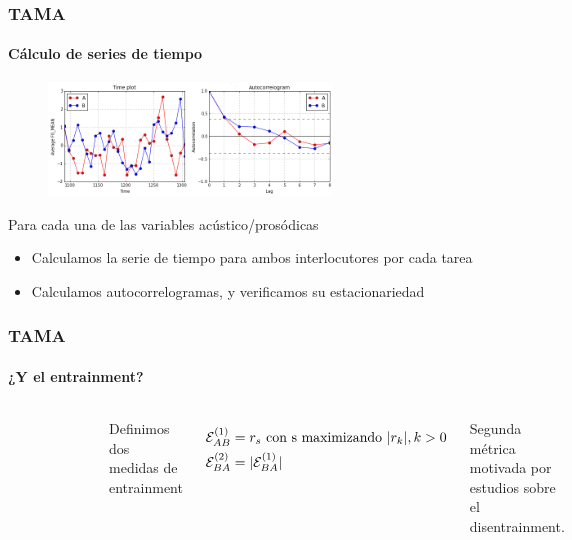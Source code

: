 \begin{frame}
\frametitle{TAMA}
\framesubtitle{Cálculo de series de tiempo}

\begin{figure}
\centering
\includegraphics[height=3cm]{images/time_plot_with_autocorrelation.png}
\end{figure}



Para cada una de las variables acústico/prosódicas

\begin{itemize}
  \item Calculamos la serie de tiempo para ambos interlocutores por cada tarea
  \item Calculamos autocorrelogramas, y verificamos su estacionariedad
\end{itemize}
\end{frame}

\begin{frame}
\frametitle{TAMA}
\framesubtitle{¿Y el entrainment?}

  \begin{columns}
    \begin{figure}[t]
      \includegraphics[scale=0.33]{images/cross_correlogram_2.png}
    \end{figure}

    Definimos dos medidas de entrainment

    \begin{align*}
      \mathcal{E}_{AB}^{(1)} &= r_s \text{ con s maximizando } |r_k|,  k > 0  \\
      \mathcal{E}_{BA}^{(2)} &= |\mathcal{E}_{BA}^{(1)}|
    \end{align*}

    Segunda métrica motivada por estudios sobre el disentrainment.
  \end{columns}
\end{frame}
